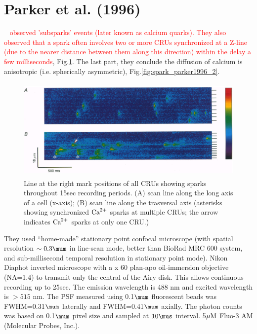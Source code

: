 \section{Parker et al. (1996)}
\label{sec:parker-et-al}

~\citep{parker1996csi} \textcolor{red}{observed 'subsparks' events (later known
as calcium quarks). They also observed that a spark often involves two or more CRUs
synchronized at a Z-line (due to the nearer distance between them along this
direction) within the delay a few milliseconds}, Fig.\ref{fig:spark_parker1996}.
The last part, they conclude the diffusion of calcium is anisotropic (i.e.
spherically asymmetric), Fig.\ref{fig:spark_parker1996_2}.

\begin{figure}[hbt]
  \centerline{\includegraphics[height=5cm,
    angle=0]{./images/spark_parker1996.eps}}
  \caption{Line at the right mark positions of all CRUs showing sparks
  throughout 15sec recording periods. (A) scan line along the long axis of a
  cell (x-axis); (B) scan line along the trasversal axis (asterisks showing
  synchronized ${\text{Ca}^{2+}}$ sparks at multiple CRUs; the arrow indicates ${\text{Ca}^{2+}}$ sparks
  at only one CRU.)} 
  \label{fig:spark_parker1996}
\end{figure}

They used ``home-made''  stationary point confocal microscope (with spatial
resolution $\sim 0.3\mum$ in line-scan mode, better than BioRad MRC 600 system,
and sub-millisecond temporal resolution in stationary point mode). Nikon Diaphot
inverted microscope with a x 60 plan-apo oil-immersion objective (NA=1.4) to
transmit only the central of the Airy disk.
This allows continuous recording up to 25sec. The emission wavelength is 488
nm and excited wavelength is $> 515$ nm. The PSF measured using 0.1$\mum$
fluorescent beads was FWHM=0.31$\mum$ laterally and FWHM=0.41$\mum$ axially. The
photon counts was based on 0.1$\mum$ pixel size and sampled at $10\mus$
interval. 5${\mu\text{M}}$ Fluo-3 AM (Molecular Probes, Inc.).

